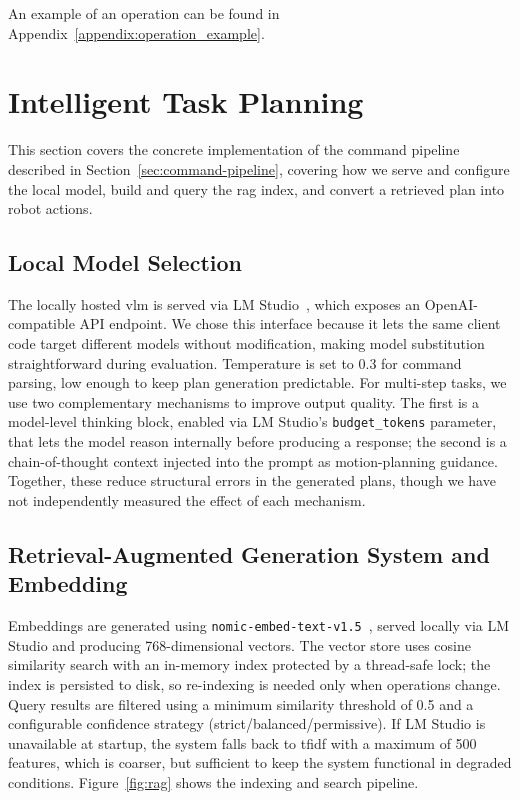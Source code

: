 An example of an operation can be found in Appendix~\ref{appendix:operation_example}.

\section{Intelligent Task Planning}\label{sec:planning-impl}
This section covers the concrete implementation of the command pipeline described in Section~\ref{sec:command-pipeline}, covering how we serve and configure the local model, build and query the \gls{rag} index, and convert a retrieved plan into robot actions.

\subsection{Local Model Selection}
The locally hosted \gls{vlm} is served via LM Studio~\cite{lmstudio}, which exposes an OpenAI-compatible API endpoint. We chose this interface because it lets the same client code target different models without modification, making model substitution straightforward during evaluation. Temperature is set to 0.3 for command parsing, low enough to keep plan generation predictable. For multi-step tasks, we use two complementary mechanisms to improve output quality. The first is a model-level thinking block, enabled via LM Studio’s \texttt{budget\_tokens} parameter, that lets the model reason internally before producing a response; the second is a chain-of-thought context injected into the prompt as motion-planning guidance. Together, these reduce structural errors in the generated plans, though we have not independently measured the effect of each mechanism.

\subsection{Retrieval-Augmented Generation System and Embedding}
Embeddings are generated using \texttt{nomic-embed-text-v1.5}~\cite{nussbaum2025nomicembedtrainingreproducible}, served locally via LM Studio and producing 768-dimensional vectors. The vector store uses cosine similarity search with an in-memory index protected by a thread-safe lock; the index is persisted to disk, so re-indexing is needed only when operations change. Query results are filtered using a minimum similarity threshold of 0.5 and a configurable confidence strategy (strict/balanced/permissive). If LM Studio is unavailable at startup, the system falls back to \gls{tfidf} with a maximum of 500 features, which is coarser, but sufficient to keep the system functional in degraded conditions. Figure~\ref{fig:rag} shows the indexing and search pipeline.

